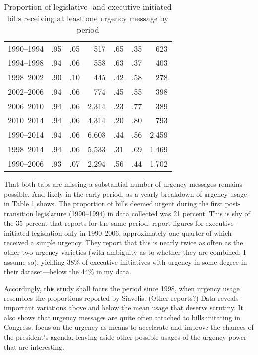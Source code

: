 \documentclass[letter,12pt]{article}
\begin{document}
\begin{table}
\begin{center}
\begin{tabular}{crrr|rrr}
1990--1994  &.95  & .05 & 517  &.65  &.35 & 623 \\
1994--1998  &.94  & .06 & 558  &.63  &.37 & 403 \\
1998--2002  &.90  & .10 & 445  &.42  &.58 & 278 \\
2002--2006  &.94  & .06 & 774  &.45  &.55 & 398 \\
2006--2010  &.94  & .06 &2,314 &.23  &.77 & 389 \\
2010--2014  &.94  & .06 &4,314 &.20  &.80 & 793 \\ \hline \hline
1990--2014  & .94 & .06 & 6,608 & .44 & .56 & 2,459 \\ 
1998--2014  & .94 & .06 & 5,533 & .31 & .69 & 1,469 \\ 
1990--2006  & .93 & .07 & 2,294 & .56 & .44 & 1,702 \\ 
\end{tabular}
\caption{Proportion of legislative- and executive-initiated bills receiving at least one urgency message by period}\label{t:yearProp}
\end{center}
\end{table}

That both tabs are missing a substantial number of urgency messages remains possible. And likely in the early period, as a yearly breakdown of urgency usage in Table \ref{t:yearProp} shows. The proportion of bills deemed urgent during the first post-transition legislature (1990--1994) in data collected was 21 percent. This is shy of the 35 percent that \citet{siavelis.2002} reports for the same period. \citet[][:404]{aleman.navia.UrgChi.2009} report figures for executive-initiated legislation only in 1990--2006, approximately one-quarter of which received a simple urgency. They report that this is nearly twice as often as the other two urgency varieties (with ambiguity as to whether they are combined; I assume so), yielding 38\% of executive initiatives with urgency in some degree in their dataset---below the 44\% in my data. 

Accordingly, this study shall focus the period since 1998, when urgency usage resembles the proportions reported by Siavelis. (Other reports?) Data reveals important variations above and below the mean usage that deserve scrutiny. It also shows that urgency messages are quite often attached to bills initating in Congress. \citet{aleman.navia.UrgChi.2009} focus on the urgency as means to accelerate and improve the chances of the president's agenda, leaving aside other possible usages of the urgency power that are interesting. 








\end{document}
